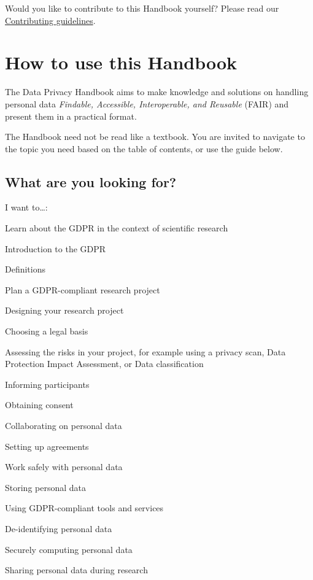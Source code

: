 \documentclass[
]{book}
\begin{document}
Would you like to contribute to this Handbook yourself? Please read our
\href{https://github.com/UtrechtUniversity/dataprivacyhandbook/blob/main/CONTRIBUTING.md}{Contributing guidelines}.

\hypertarget{how-to-use-this-handbook}{%
\section{How to use this Handbook}\label{how-to-use-this-handbook}}

The Data Privacy Handbook aims to make knowledge and solutions on handling personal
data \emph{Findable, Accessible, Interoperable, and Reusable} (FAIR) and present them in
a practical format.

The Handbook need not be read like a textbook. You are invited to navigate to the
topic you need based on the table of contents, or use the guide below.

\hypertarget{what-are-you-looking-for}{%
\subsection{What are you looking for?}\label{what-are-you-looking-for}}

I want to\ldots:

Learn about the GDPR in the context of scientific research

Introduction to the GDPR

Definitions

Plan a GDPR-compliant research project

Designing your research project

Choosing a legal basis

Assessing the risks in your project,
for example using a privacy scan,
Data Protection Impact Assessment, or
Data classification

Informing participants

Obtaining consent

Collaborating on personal data

Setting up agreements

Work safely with personal data

Storing personal data

Using GDPR-compliant tools and services

De-identifying personal data

Securely computing personal data

Sharing personal data during research
\end{document}
